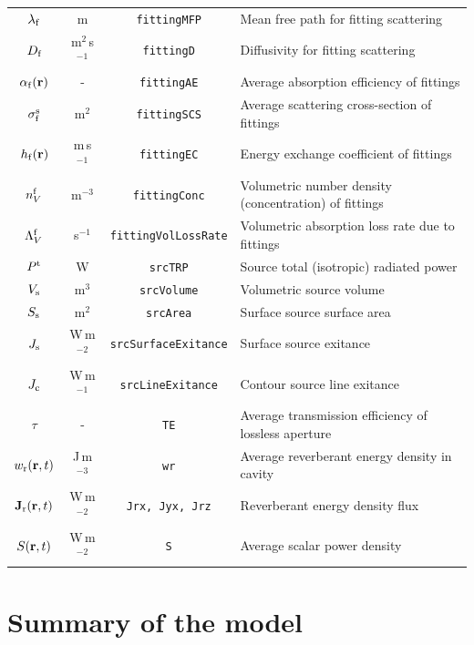 \documentclass[a4paper]{article}
\numberwithin{equation}{section}
\begin{document}
\begin{center}
\begin{supertabular}{|c|c|c|l|}
$\lambda _{\mathrm{f}}$      &m               &\texttt{fittingMFP}         &Mean free path for fitting scattering \\
$D_{\mathrm{f}}$             &m$^2$\,s$^{-1}$ &\texttt{fittingD}           &Diffusivity for fitting scattering \\
$\alpha_{\mathrm{f}}(\boldsymbol{\mathrm{r}})$     &-               &\texttt{fittingAE}          &Average absorption efficiency of fittings \\
$\sigma_{\mathrm{f}}^{\mathrm{s}}$    &m$^2$           &\texttt{fittingSCS}         &Average scattering cross-section of fittings \\
$h_{\mathrm{f}}(\boldsymbol{\mathrm{r}})$          &m\,s$^{-1}$     &\texttt{fittingEC}          &Energy exchange coefficient of fittings \\
$n_V^{\mathrm{f}}$           &m$^{-3}$        &\texttt{fittingConc}        &Volumetric number density (concentration) of fittings \\
$\Lambda_V^{\mathrm{f}}$     &s$^{-1}$        &\texttt{fittingVolLossRate} &Volumetric absorption loss rate due to fittings \\
$P^{\mathrm{t}}$             &W               &\texttt{srcTRP}             &Source total (isotropic) radiated power \\
$V_{\mathrm{s}}$             &m$^3$           &\texttt{srcVolume}          &Volumetric source volume \\
$S_{\mathrm{s}}$             &m$^2$           &\texttt{srcArea}            &Surface source surface area \\
$J_{\mathrm{s}}$             &W\,m$^{-2}$     &\texttt{srcSurfaceExitance} &Surface source exitance \\
$J_{\mathrm{c}}$             &W\,m$^{-1}$     &\texttt{srcLineExitance}    &Contour source line exitance \\
$\tau$              &-               &\texttt{TE}                 &Average transmission efficiency of lossless aperture \\
$w_{\mathrm{r}}(\boldsymbol{\mathrm{r}},t)$         &J\,m$^{-3}$     &\texttt{wr}                 &Average reverberant energy density in cavity \\
$\boldsymbol{\mathrm{J}}_{\mathrm{r}}(\boldsymbol{\mathrm{r}},t)$       &W\,m$^{-2}$     &\texttt{Jrx, Jyx, Jrz}      &Reverberant energy density flux \\
$S(\boldsymbol{\mathrm{r}},t)$             &W\,m$^{-2}$     &\texttt{S}                  &Average scalar power density \\
\hline
\end{supertabular}
\end{center}

\newpage

\section[Summary of the model]{Summary of the model}
\label{sc:sum}
\end{document}
